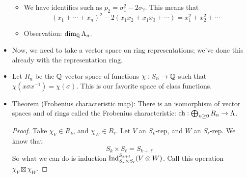 \documentclass[../notes.tex]{subfiles}
\begin{document}
\begin{itemize}
\begin{itemize}
        \item We have identifies such as $p_2=\sigma_1^2-2\sigma_2$. This means that
        \begin{equation*}
            (x_1+\cdots+x_n)^2-2(x_1x_2+x_1x_3+\cdots) = x_1^2+x_2^2+\cdots
        \end{equation*}
        \item Observation: $\dim_{\mathbb{Q}}\Lambda_n$.
    \end{itemize}
    \item Now, we need to take a vector space on ring representations; we've done this already with the representation ring.
    \item Let $R_n$ be the $\mathbb{Q}$-vector space of functions $\chi:S_n\to\mathbb{Q}$ such that $\chi(x\sigma x^{-1})=\chi(\sigma)$. This is our favorite space of class functions.
    \item Theorem (Frobenius characteristic map): There is an isomorphism of vector spaces and of rings called the Frobenius characteristic: $\operatorname{ch}:\bigoplus_{n\geq 0}R_n\to\Lambda$.
    \begin{proof}
        Take $\chi_V\in R_k$, and $\chi_W\in R_\ell$. Let $V$ an $S_k$-rep, and $W$ an $S_\ell$-rep. We know that
        \begin{equation*}
            S_k\times S_\ell = S_{k+\ell}
        \end{equation*}
        So what we can do is induction $\operatorname{Ind}_{S_k\times S_\ell}^{S_{k+\ell}}(V\otimes W)$. Call this operation $\chi_V\boxtimes\chi_W$.


\end{proof}
\end{itemize}
\end{document}
